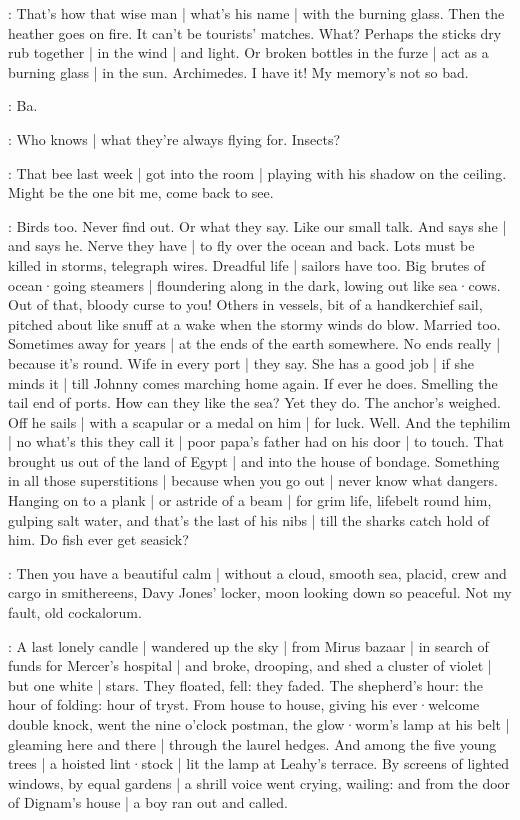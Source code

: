 \BloomAbstract:
That's how that wise man |
what's his name |
with the burning glass.
Then the heather goes on fire.
It can't be tourists' matches.
What?%
Perhaps the sticks dry rub together |
in the wind |
and light.
Or broken bottles in the furze |
act as a burning glass |
in the sun.
Archimedes.
I have it!
My memory's not so bad.

\bat:
Ba.

\BloomCurrent:
Who knows |
what they're always flying for.
Insects?

\BloomHist:
That bee last week |
got into the room |
playing with his shadow
on the ceiling.
Might be the one bit me,
come back to see.

\BloomAbstract:
Birds too.
Never find out.
Or what they say.
Like our small talk.
And says she |
and says he.
Nerve they have |
to fly over the ocean
and back.
Lots must be killed in storms,
telegraph wires.
Dreadful life |
sailors have too.
Big brutes of ocean·going steamers |
floundering along in the dark,
lowing out like sea·cows.
Out of that,
bloody curse to you!%
Others in vessels,
bit of a handkerchief sail,
pitched about like snuff at a wake
when the stormy winds do blow.
Married too.
Sometimes away for years |
at the ends of the earth somewhere.
No ends really |
because it's round.
Wife in every port |
they say.
She has a good job |
if she minds it |
till Johnny comes marching home again.
If ever he does.
Smelling the tail end of ports.
How can they like the sea?
Yet they do.
The anchor's weighed.
Off he sails |
with a scapular or a medal on him |
for luck.
Well.
And the tephilim |
no what's this they call it |
poor papa's father had on his door |
to touch.
That brought us out of the land of Egypt |
and into the house of bondage.
Something in all those superstitions |
because when you go out |
never know what dangers.%
Hanging on to a plank |
or astride of a beam |
for grim life,
lifebelt round him,
gulping salt water,
and that's the last of his nibs |
till the sharks catch hold of him.
Do fish ever get seasick?

\BloomAbstract:
Then you have a beautiful calm |
without a cloud,
smooth sea,
placid,
crew and cargo in smithereens,
Davy Jones' locker,
moon looking down so peaceful.
Not my fault,
old cockalorum.

\Nnovel:
A last lonely candle |
wandered up the sky |
from Mirus bazaar |
in search of funds for Mercer's hospital |
and broke,
drooping,
and shed a cluster of violet |
but one white |
stars.
They floated,
fell:
they faded.
The shepherd's hour:
the hour of folding:
hour of tryst.
From house to house,
giving his ever·welcome double knock,%
went the nine o'clock postman,
the glow·worm's lamp at his belt |
gleaming here and there |
through the laurel hedges.
And among the five young trees |
a hoisted lint·stock |
lit the lamp at Leahy's terrace.
By screens of lighted windows,
by equal gardens |
a shrill voice went crying,
wailing:
and from the door of Dignam's house |
a boy ran out and called.

